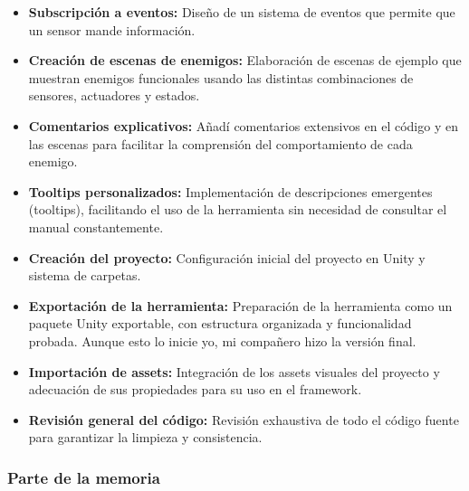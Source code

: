 \begin{itemize}
  \item \textbf{Subscripción a eventos:} Diseño de un sistema de eventos que permite que un sensor mande información.
  \item \textbf{Creación de escenas de enemigos:} Elaboración de escenas de ejemplo que muestran enemigos funcionales usando las distintas combinaciones de sensores, actuadores y estados.
  \item \textbf{Comentarios explicativos:} Añadí comentarios extensivos en el código y en las escenas para facilitar la comprensión del comportamiento de cada enemigo.
  \item \textbf{Tooltips personalizados:} Implementación de descripciones emergentes (tooltips), facilitando el uso de la herramienta sin necesidad de consultar el manual constantemente.
 \item \textbf{Creación del proyecto:} Configuración inicial del proyecto en Unity y sistema de carpetas.
 \item \textbf{Exportación de la herramienta:} Preparación de la herramienta como un paquete Unity exportable, con estructura organizada y funcionalidad probada. Aunque esto lo inicie yo, mi compañero hizo la versión final.
  \item \textbf{Importación de assets:} Integración de los assets visuales del proyecto y adecuación de sus propiedades para su uso en el framework.
  \item \textbf{Revisión general del código:} Revisión exhaustiva de todo el código fuente para garantizar la limpieza y consistencia.
\end{itemize}

\subsubsection*{Parte de la memoria}


